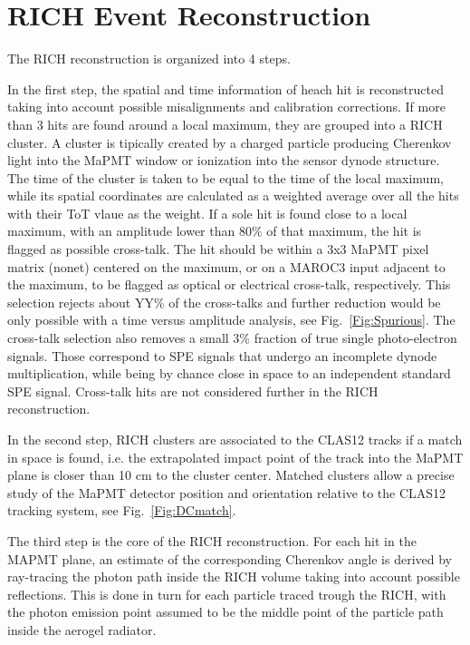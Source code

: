 \documentclass[final,5p,times,twocolumn]{elsarticle}
\def\MAPMT{MaPMT }
\def\MAROC{MAROC3 }
\begin{document}
\section{RICH Event Reconstruction}

The RICH reconstruction is organized into 4 steps. 

In the first step, the spatial and time information 
of heach hit is reconstructed taking into account possible misalignments and calibration
corrections. If more than 3 hits are found around a local maximum, they are grouped
into a RICH cluster. A cluster is tipically created by a charged particle producing
Cherenkov light into the \MAPMT window or ionization into the sensor dynode structure.
The time of the cluster is taken to be equal to the time of the local maximum, while its
spatial coordinates are calculated as a weighted average over all the hits with their 
ToT vlaue as the weight.
If a sole hit is found close to a local maximum, with an amplitude lower than 80\% of that 
maximum, the hit is flagged as possible cross-talk. The hit should be within a 3x3 \MAPMT 
pixel matrix (nonet) centered on the maximum, or on a \MAROC input adjacent to the maximum, 
to be flagged as optical or electrical cross-talk, respectively. This selection rejects about
YY\% of the cross-talks and further reduction would be only possible with a time 
versus amplitude analysis, see Fig.~\ref{Fig:Spurious}. The cross-talk selection also removes
a small 3\% fraction of true single photo-electron signals. Those correspond to SPE signals
that undergo an incomplete dynode multiplication, while being by chance close in space
to an independent standard SPE signal.
Cross-talk hits are not considered further in the RICH reconstruction.

In the second step, RICH clusters are associated to the CLAS12 tracks if a match in space
is found, i.e. the extrapolated impact point of the track into the \MAPMT plane is closer 
than 10 cm to the cluster center. Matched clusters allow a precise study of the \MAPMT
detector position and orientation relative to the CLAS12 tracking system, see Fig.~\ref{Fig:DCmatch}.

The third step is the core of the RICH reconstruction. For each hit in the MAPMT plane, an estimate of the corresponding Cherenkov 
angle is derived by ray-tracing the photon path inside the RICH volume taking into account 
possible reflections. This is done in turn for each particle traced trough the RICH,
with the photon emission point assumed to be the middle 
point of the particle path inside the aerogel radiator. 
\end{document}
